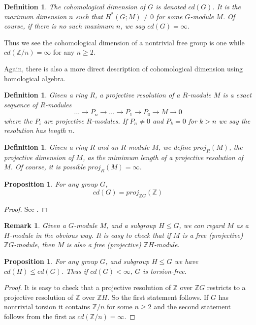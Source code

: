 \documentclass{amsart}
\newtheorem{prop}[thm]{Proposition}
\newtheorem{rem}[thm]{Remark}
\newtheorem{defn}[thm]{Definition}
\begin{document}
\begin{defn}
The cohomological dimension of $G$ is denoted $cd(G)$. 
It is the maximum dimension $n$ such
that $H^*(G;M) \neq 0$ for some $G$-module $M$. Of course, if there is
no such maximum $n$, we say $cd(G)=\infty$. 
\end{defn}

Thus we see the cohomological dimension of a nontrivial free group is
one while $cd(\mathbb{Z}/n)=\infty$ for any 
$n \geq 2$.

Again, there is also a more direct description of cohomological dimension
using homological algebra.

\begin{defn}
Given a ring $R$, a projective resolution of a $R$-module $M$ is a 
exact sequence of $R$-modules
$$
\dots \rightarrow P_n \rightarrow \dots \rightarrow P_1 \rightarrow P_0
\rightarrow M \rightarrow 0
$$
where the $P_i$ are projective $R$-modules.
If $P_n \neq 0$ and $P_k=0$ for $k>n$ we say the resolution has length $n$.
\end{defn}

\begin{defn}
Given a ring $R$ and an $R$-module $M$, we define $proj_R(M)$, the projective
dimension of $M$, as the mimimum length of a projective resolution
of $M$. Of course, it is possible $proj_R(M)=\infty$.
\end{defn}

\begin{prop}
For any group $G$, 
$$
cd(G) = proj_{\mathbb{Z}G}(\mathbb{Z})
$$
\end{prop}
\begin{proof}
See \cite{Brown}.
\end{proof}

\begin{rem}
Given a $G$-module $M$, and a subgroup $H \le G$, we can regard
$M$ as a $H$-module in the obvious way. It is easy to check that
if $M$ is a free (projective) $\mathbb{Z}G$-module, then 
$M$ is also a free (projective) $\mathbb{Z}H$-module.
\end{rem}

\begin{prop}
For any group $G$, and subgroup $H \le G$ we have $cd(H) \leq cd(G)$.
Thus if $cd(G) < \infty$, $G$ is torsion-free.
\end{prop}
\begin{proof}
It is easy to check that a projective resolution of $\mathbb{Z}$ over
$\mathbb{Z}G$ restricts to a projective resolution of $\mathbb{Z}$ over
 $\mathbb{Z}H$. So the first statement
follows. If $G$ has nontrivial torsion it contains $\mathbb{Z}/n$ for some
$n \geq 2$ and the second statement follows from the first as 
$cd(\mathbb{Z}/n)=\infty$. 
\end{proof}
\end{document}
